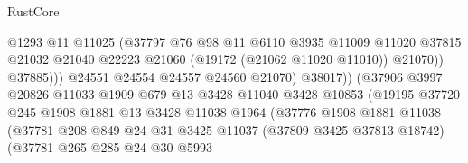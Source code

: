 \begin{lexlean}{RustCore}
\begin{coremodule}
                                        @1293
                                        @11
                                        @11025
                                        (@37797
                                          @76
                                          @98
                                          @11
                                          @6110
                                          @3935
                                          @11009
                                          @11020
                                          @37815
                                          @21032
                                          @21040
                                          @22223
                                          @21060
                                          (@19172 (@21062 @11020 @11010))
                                          @21070))
                                      @37885)))
                                @24551
                                @24554
                                @24557
                                @24560
                                @21070)
                              @38017))
                          (@37906
                            @3997
                            @20826
                            @11033
                            @1909
                            @679
                            @13
                            @3428
                            @11040
                            @3428
                            @10853
                            (@19195
                              @37720
                              @245
                              @1908
                              @1881
                              @13
                              @3428
                              @11038
                              @1964
                              (@37776
                                @1908
                                @1881
                                @11038
                                (@37781
                                  @208
                                  @849
                                  @24
                                  @31
                                  @3425
                                  @11037
                                  (@37809 @3425 @37813 @18742)
                                  (@37781
                                    @265
                                    @285
                                    @24
                                    @30
                                    @5993

\end{coremodule}
\end{lexlean}
